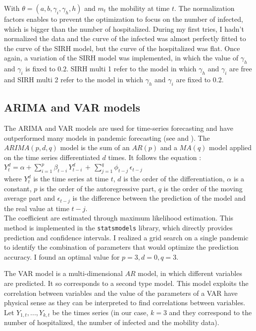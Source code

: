 With $\theta = (a, b, \gamma_i, \gamma_h, h)$ and $m_t$ the mobility at time $t$.
The normalization factors enables to prevent the optimization to focus on the number of infected, which is bigger than the number of hospitalized. 
During my first tries, I hadn't normalized the data and the curve of the infected was almost perfectly fitted to the curve of the SIRH model, but the curve of the hospitalized was flat. 
Once again, a variation of the SIRH model was implemented, in which the value of $\gamma_h$ and $\gamma_i$ is fixed to $0.2$. 
SIRH multi 1 refer to the model in which $\gamma_h$ and $\gamma_i$ are free and SIRH multi 2 refer to the model in which $\gamma_h$ and $\gamma_i$ are fixed to $0.2$.



\subsection{ARIMA and VAR models} 

The ARIMA and VAR models are used for time-series forecasting and have outperformed many models in pandemic forecasting (see \cite{kufel2020arima} and \cite{shang2021regional}).
The $ARIMA(p, d, q)$ model is the sum of an $AR(p)$ and a $MA(q)$ model applied on the time series differentiated $d$ times. 
It follows the equation : \\
$Y_{t}^{d}=\alpha+\sum_{i=1}^{p}\beta_{t-i}\,Y_{t-i}^{d}\,+\,\sum_{j=1}^{q}\phi_{t-j}\,\epsilon_{t-j} \label{eq:arima}$\\ 
where $Y_{t}^{d}$ is the time series at time $t$, $d$ is the order of the differentiation, $\alpha$ is a constant, $p$ is the order of the autoregressive part, $q$ is the order of the moving average part and $\epsilon_{t-j}$ is the difference between the prediction of the model and the real value at time $t-j$.\\
The coefficient are estimated through maximum likelihood estimation. 
This method is implemented in the \texttt{statsmodels} library, which directly provides prediction and confidence intervals.
I realized a grid search on a single pandemic to identify the combination of parameters that would optimize the prediction accuracy. 
I found an optimal value for $p= 3, d=0, q=3$. 

The VAR model is a multi-dimensional $AR$ model, in which different variables are predicted. 
It so corresponds to a second type model. 
This model exploits the correlation between variables and the value of the parameters of a VAR have physical sense as they can be interpreted to find correlations between variables. 
Let $Y_{1,t}, ..., Y_{k,t}$ be the times series (in our case, $k=3$ and they correspond to the number of hospitalized, the number of infected and the mobility data).




